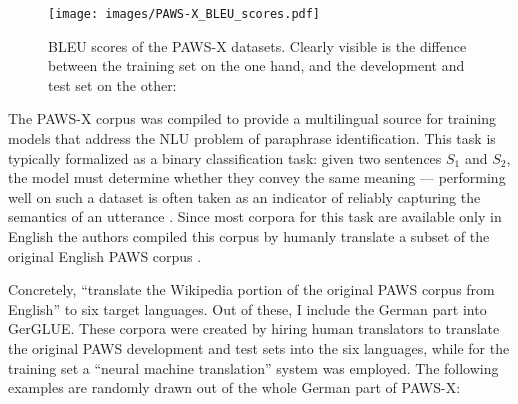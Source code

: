 \begin{wrapfigure}[21]{l}{0.45\linewidth}
  \begin{center}
    \texttt{[image: images/PAWS-X\_BLEU\_scores.pdf]}
  \end{center}
  \caption[PAWS-X BLEU]{BLEU scores of the PAWS-X datasets. Clearly visible is the diffence between the training set on the one hand,
                      and the development and test set on the other:}
\end{wrapfigure}

The PAWS-X corpus \cite{yang2019paws} was compiled to provide a multilingual source for
training models that address the NLU problem of paraphrase identification. This task
is typically formalized as a binary classification task: given two sentences $S_1$ and
$S_2$, the model must determine whether they convey the same meaning --- performing well
on such a dataset is often taken as an indicator of reliably capturing the semantics
of an utterance \citep{mckeown1980paraphrasing}. Since most corpora for this task are
available only in English the authors compiled this corpus by humanly translate a subset
of the original English PAWS corpus \citep{zhang2019paws}.

Concretely, \citeauthor{yang2019paws} ``translate the Wikipedia portion of the original PAWS
corpus from English'' to six target languages. Out of these, I include the German part into
GerGLUE. These corpora were created by hiring human translators to translate the original
PAWS development and test sets into the six languages, while for the training set a ``neural
machine translation'' system was employed. The following examples are randomly drawn out of
the whole German part of PAWS-X:

